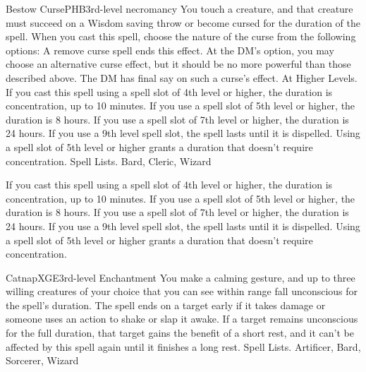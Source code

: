 \begin{spell}{Bestow Curse}{PHB}{3rd-level necromancy}
{
}
You touch a creature, and that creature must succeed on a Wisdom saving throw or become cursed for the duration of the spell. When you cast this spell, choose the nature of the curse from the following options:
A remove curse spell ends this effect. At the DM's option, you may choose an alternative curse effect, but it should be no more powerful than those described above. The DM has final say on such a curse's effect.
At Higher Levels. If you cast this spell using a spell slot of 4th level or higher, the duration is concentration, up to 10 minutes. If you use a spell slot of 5th level or higher, the duration is 8 hours. If you use a spell slot of 7th level or higher, the duration is 24 hours. If you use a 9th level spell slot, the spell lasts until it is dispelled. Using a spell slot of 5th level or higher grants a duration that doesn't require concentration.
Spell Lists. Bard, Cleric, Wizard

 If you cast this spell using a spell slot of 4th level or higher, the duration is concentration, up to 10 minutes. If you use a spell slot of 5th level or higher, the duration is 8 hours. If you use a spell slot of 7th level or higher, the duration is 24 hours. If you use a 9th level spell slot, the spell lasts until it is dispelled. Using a spell slot of 5th level or higher grants a duration that doesn't require concentration.
\end{spell}

\begin{spell}{Catnap}{XGE}{3rd-level Enchantment}
{
}
You make a calming gesture, and up to three willing creatures of your choice that you can see within range fall unconscious for the spell’s duration. The spell ends on a target early if it takes damage or someone uses an action to shake or slap it awake. If a target remains unconscious for the full duration, that target gains the benefit of a short rest, and it can’t be affected by this spell again until it finishes a long rest.
Spell Lists. Artificer, Bard, Sorcerer, Wizard
\end{spell}

